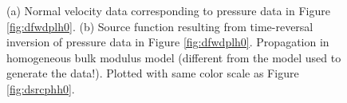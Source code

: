 \documentclass[georeport,12pt]{geophysics}
\begin{document}
\begin{figure}
  \centering
  \caption{(a) Normal velocity data corresponding to pressure data in
    Figure \ref{fig:dfwdplh0}. (b) Source function resulting from time-reversal inversion
    of pressure data in Figure \ref{fig:dfwdplh0}. Propagation in homogeneous
    bulk modulus model (different from the model used to generate the
    data!). Plotted with same color scale as Figure \ref{fig:dsrcphh0}.}
\end{figure}
\end{document}
